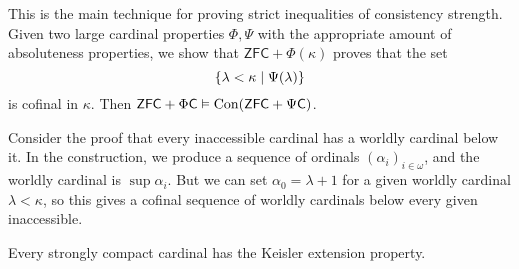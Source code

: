 \begin{remark}
    This is the main technique for proving strict inequalities of consistency strength.
    Given two large cardinal properties \( \Phi, \Psi \) with the appropriate amount of absoluteness properties, we show that \( \mathsf{ZFC} + \Phi(\kappa) \) proves that the set
    \[ \qty{\lambda < \kappa \mid \Psi(\lambda)} \]
    is cofinal in \( \kappa \).
    Then \( \mathsf{ZFC} + \Phi\mathsf{C} \vDash \operatorname{Con}(\mathsf{ZFC} + \Psi\mathsf{C}) \).
\end{remark}
\begin{example}
    Consider the proof that every inaccessible cardinal has a worldly cardinal below it.
    In the construction, we produce a sequence of ordinals \( (\alpha_i)_{i \in \omega} \), and the worldly cardinal is \( \sup \alpha_i \).
    But we can set \( \alpha_0 = \lambda + 1 \) for a given worldly cardinal \( \lambda < \kappa \), so this gives a cofinal sequence of worldly cardinals below every given inaccessible.
\end{example}
\begin{theorem}
    Every strongly compact cardinal has the Keisler extension property.
\end{theorem}
